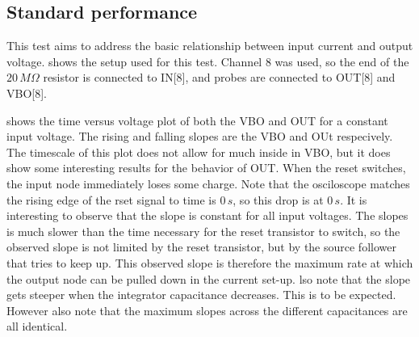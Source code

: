 \clearpage
\subsection{Standard performance}\label{ssec:standard}
This test aims to address the basic relationship between input current and output voltage.  shows the setup used for this test. Channel 8 was used, so the end of the $20\,M\Omega$ resistor is connected to IN[8], and probes are connected to OUT[8] and VBO[8]. 



 shows the time versus voltage plot of both the VBO and OUT for a constant input voltage. The rising and falling slopes are the VBO and OUt respecively. The timescale of this plot does not allow for much inside in VBO, but it does show some interesting results for the behavior of OUT. When the reset switches, the input node immediately loses some charge. Note that the osciloscope matches the rising edge of the rset signal to time is $0\,s$, so this drop is at $0\,s$. It is interesting to observe that the slope is constant for all input voltages. The slopes is much slower than the time necessary for the reset transistor to switch, so the observed slope is not limited by the reset transistor, but by the source follower that tries to keep up. This observed slope is therefore the maximum rate at which the output node can be pulled down in the current set-up.  lso note that the slope gets steeper when the integrator capacitance decreases. This is to be expected. However also note that the maximum slopes across the different capacitances are all identical.


